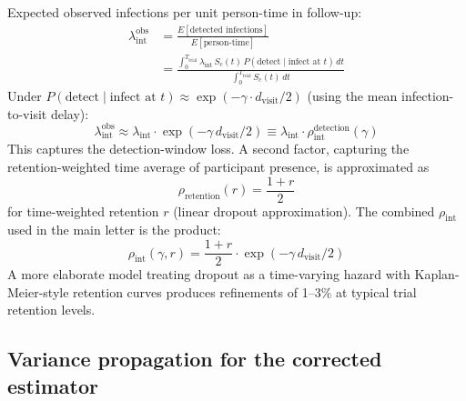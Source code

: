 \documentclass[11pt]{article}
\begin{document}
Expected observed infections per unit person-time in follow-up:
\begin{align}
\lambda^{\mathrm{obs}}_{\mathrm{int}} &= \frac{E[\text{detected infections}]}{E[\text{person-time}]} \\
&= \frac{\int_0^{T_{\mathrm{trial}}} \lambda_{\mathrm{int}}\, S_c(t)\, P(\text{detect} \mid \text{infect at } t)\,dt}{\int_0^{T_{\mathrm{trial}}} S_c(t)\,dt}
\end{align}
Under $P(\text{detect} \mid \text{infect at } t) \approx \exp(-\gamma \cdot d_{\mathrm{visit}}/2)$ (using the mean infection-to-visit delay):
\begin{equation}
\lambda^{\mathrm{obs}}_{\mathrm{int}} \approx \lambda_{\mathrm{int}} \cdot \exp(-\gamma\, d_{\mathrm{visit}}/2) \equiv \lambda_{\mathrm{int}} \cdot \rho_{\mathrm{int}}^{\text{detection}}(\gamma)
\end{equation}
This captures the detection-window loss. A second factor, capturing the retention-weighted time average of participant presence, is approximated as
\begin{equation}
\rho_{\mathrm{retention}}(r) = \frac{1+r}{2}
\end{equation}
for time-weighted retention $r$ (linear dropout approximation). The combined $\rho_{\mathrm{int}}$ used in the main letter is the product:
\begin{equation}
\rho_{\mathrm{int}}(\gamma, r) = \frac{1+r}{2} \cdot \exp(-\gamma\, d_{\mathrm{visit}}/2)
\end{equation}
A more elaborate model treating dropout as a time-varying hazard with Kaplan-Meier-style retention curves produces refinements of 1--3\% at typical trial retention levels.

\subsection{Variance propagation for the corrected estimator}
\end{document}
